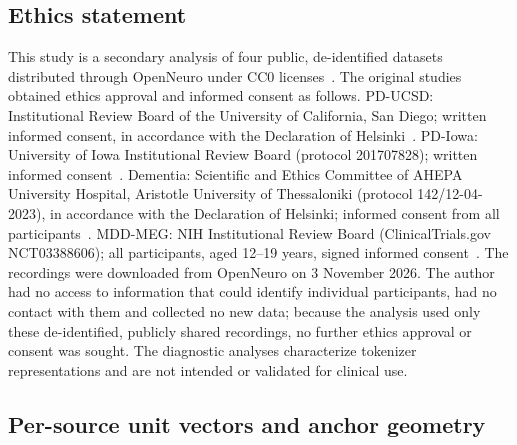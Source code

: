 \documentclass[10pt,letterpaper]{article}
\begin{document}
\subsection*{Ethics statement}\label{sec:methods-ethics}

This study is a secondary analysis of four public, de-identified datasets distributed through
OpenNeuro under CC0 licenses~\cite{ds002778,ds004584,ds004504,ds003568}. The original studies obtained
ethics approval and informed consent as follows. PD-UCSD: Institutional Review Board of the University
of California, San Diego; written informed consent, in accordance with the Declaration of
Helsinki~\cite{george2013dopaminergic,jackson2019waveform}. PD-Iowa: University of Iowa Institutional
Review Board (protocol 201707828); written informed consent~\cite{anjum2024resting}. Dementia:
Scientific and Ethics Committee of AHEPA University Hospital, Aristotle University of Thessaloniki
(protocol 142/12-04-2023), in accordance with the Declaration of Helsinki; informed consent from all
participants~\cite{miltiadous2023dataset}. MDD-MEG: NIH Institutional Review Board (ClinicalTrials.gov
NCT03388606); all participants, aged 12--19 years, signed informed consent~\cite{liuzzi2022meg}. The
recordings were downloaded from OpenNeuro on 3 November 2026. The author had no access to information
that could identify individual participants, had no contact with them and collected no new data;
because the analysis used only these de-identified, publicly shared recordings, no further ethics
approval or consent was sought. The diagnostic analyses characterize tokenizer representations and are
not intended or validated for clinical use.

\subsection*{Per-source unit vectors and anchor geometry}\label{sec:methods-geometry}
\end{document}
